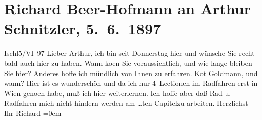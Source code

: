 

         
         \renewcommand{\erwaehntePersonen}{Personen: Paul Goldmann}
         \renewcommand{\erwaehnteOrte}{Orte: Bad Ischl, Wien}
         \renewcommand{\erwaehnteWerke}{Werke: Der Tod Georgs}
               \section[Richard Beer-Hofmann an Arthur Schnitzler, 5. 6. 1897]{ Richard Beer-Hofmann an Arthur Schnitzler, 5. 6. 1897}\nopagebreak{}\rehead{ }\begin{ledgroupsized}[t]{13cm}\normalsize\beginnumbering \toendnotes[C]{\smallbreak\pagebreak[2]} 
\toendnotes[C]{\smallbreak}\pstart
           \centering{}{\pb}Ischl5/VI 97\pend
           \pstart
           Lieber Arthur, ich bin seit Donnerstag hier und wünsche
               Sie recht bald auch hier zu haben. Wann ko{\geminationm}en Sie voraussichtlich, und wie lange {\pb}bleiben Sie hier? Anderes hoffe ich
               mündlich von Ihnen zu erfahren.\pend
           \pstart
           Ko{\geminationm}t Goldmann, und
               wann?\pend
           \pstart
           Hier ist es wunderschön und da ich nur 4 Lectionen {\pb}im Radfahren erst in Wien geno{\geminationm}en habe, muß ich hier
               weiterlernen. Ich hoffe aber daß Rad u. Radfahren mich nicht hindern werden am {\dots}ten Capitelzu arbeiten.\pend
           \pstart
           Herzlichst{\\[\baselineskip]}Ihr \spacefill\mbox{Richard}\pend
           \leftskip=0em{}
         
         \endnumbering{}\end{ledgroupsized}  \newcommand{\dateiname}{L00683}\newcommand{\titel}{Richard Beer-Hofmann an Arthur Schnitzler, 5. 6. 1897}\newcommand{\editorInnen}{Martin Anton Müller und Gerd-Hermann Susen}
      